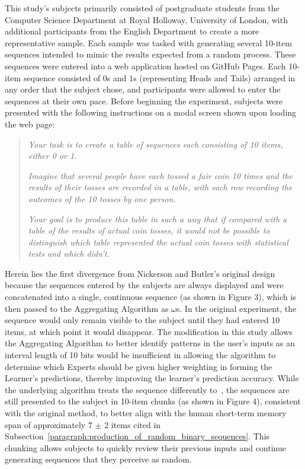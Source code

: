 This study's subjects primarily consisted of postgraduate students from the Computer Science Department at Royal Holloway, University of London, with additional participants from the English Department to create a more representative sample. Each sample was tasked with generating several 10-item sequences intended to mimic the results expected from a random process. These sequences were entered into a web application hosted on GitHub Pages. Each 10-item sequence consisted of $0$s and $1$s (representing Heads and Tails) arranged in any order that the subject chose, and participants were allowed to enter the sequences at their own pace. Before beginning the experiment, subjects were presented with the following instructions on a modal screen shown upon loading the web page:

\begin{quote}
    \textit{Your task is to create a table of sequences each consisting of 10 items, either 0 or 1.}

    \textit{Imagine that several people have each tossed a fair coin 10 times and the results of their tosses are recorded in a table, with each row recording the outcomes of the 10 tosses by one person.}

    \textit{Your goal is to produce this table in such a way that if compared with a table of the results of actual coin tosses, it would not be possible to distinguish which table represented the actual coin tosses with statistical tests and which didn't.}
\end{quote}

\noindent Herein lies the first divergence from Nickerson and Butler's original design because the sequences entered by the subjects are always displayed and were concatenated into a single, continuous sequence (as shown in Figure 3), which is then passed to the Aggregating Algorithm as $\omega$s. In the original experiment, the sequence would only remain visible to the subject until they had entered 10 items, at which point it would disappear. The modification in this study allows the Aggregating Algorithm to better identify patterns in the user's inputs as an interval length of 10 bits would be insufficient in allowing the algorithm to determine which Experts should be given higher weighting in forming the Learner's predictions, thereby improving the learner's prediction accuracy. While the underlying algorithm treats the sequence differently to~\cite{nickerson:2009}, the sequences are still presented to the subject in 10-item chunks (as shown in Figure 4), consistent with the original method, to better align with the human short-term memory span of approximately 7 $\pm$ 2 items cited in Subsection~\ref{paragraph:production_of_random_binary_sequences}. This chunking allows subjects to quickly review their previous inputs and continue generating sequences that they perceive as random.

